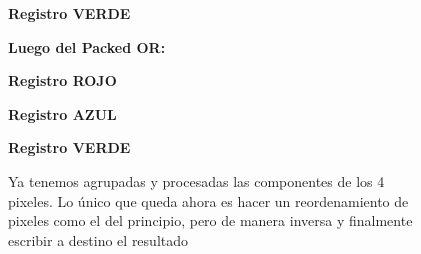 \begin{itemize}
\begin{itemize}
\begin{figure}[!ht]
              \textbf{Registro VERDE}
              \bigskip          
            \textbf{Luego del Packed OR:}
               
			 \textbf{Registro ROJO}
                 \bigskip         
            
            \textbf{Registro AZUL}
				 \bigskip              
              
              \textbf{Registro VERDE}
              \bigskip                
               
              \caption{Ya tenemos agrupadas y procesadas las componentes de los 4 pixeles. Lo único que queda ahora es hacer un reordenamiento de pixeles como el del principio, pero de manera inversa y finalmente escribir a destino el resultado} 
        \end{figure}
                  
          \end{itemize}
\end{itemize}
\newpage

